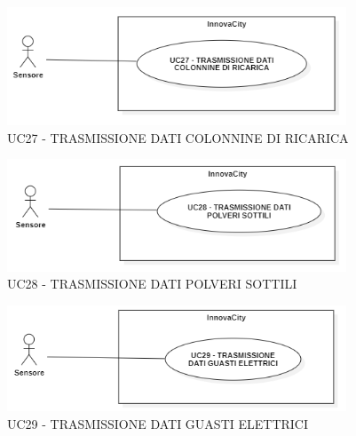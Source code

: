
\begin{figure}[H]
    \centering
    \includegraphics[width=0.9\textwidth]{../Images/uc27.PNG}
    \caption{UC27 - TRASMISSIONE DATI COLONNINE DI RICARICA}
\end{figure}

\begin{figure}[H]
    \centering
    \includegraphics[width=0.9\textwidth]{../Images/uc28.PNG}
    \caption{UC28 - TRASMISSIONE DATI POLVERI SOTTILI}
\end{figure}

\begin{figure}[H]
    \centering
    \includegraphics[width=0.9\textwidth]{../Images/uc29.PNG}
    \caption{UC29 - TRASMISSIONE DATI GUASTI ELETTRICI}
\end{figure}



\setcounter{rowcounter}{1}

